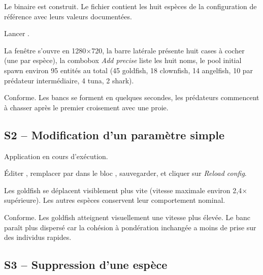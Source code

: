 \begin{description}[leftmargin=3em]
  \item[Préconditions.] Le binaire  est
    construit. Le fichier  contient les
    huit espèces de la configuration de référence avec leurs
    valeurs documentées.
  \item[Action.] Lancer .
  \item[Attendu.] La fenêtre s'ouvre en 1280$\times$720, la
    barre latérale présente huit cases à cocher (une par
    espèce), la combobox \emph{Add precise} liste les huit
    noms, le pool initial spawn environ 95 entités au total
    (45 goldfish, 18 clownfish, 14 angelfish, 10 par prédateur
    intermédiaire, 4 tuna, 2 shark).
  \item[Observé.] Conforme. Les bancs se forment en quelques
    secondes, les prédateurs commencent à chasser après le
    premier croisement avec une proie.
\end{description}

\subsection{S2 -- Modification d'un paramètre simple}

\begin{description}[leftmargin=3em]
  \item[Préconditions.] Application en cours d'exécution.
  \item[Action.] Éditer , remplacer
     par  dans
    le bloc \code{[[species]]} , sauvegarder, et
    cliquer sur \emph{Reload config}.
  \item[Attendu.] Les goldfish se déplacent visiblement plus
    vite (vitesse maximale environ 2,4$\times$ supérieure). Les
    autres espèces conservent leur comportement nominal.
  \item[Observé.] Conforme. Les goldfish atteignent visuellement
    une vitesse plus élevée. Le banc paraît plus dispersé car la
    cohésion à pondération inchangée a moins de prise sur des
    individus rapides.
\end{description}

\subsection{S3 -- Suppression d'une espèce}


